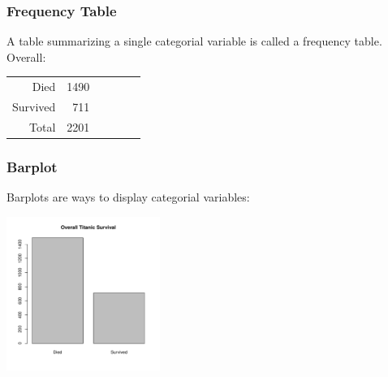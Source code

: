 \documentclass[handout]{beamer}
\newcommand{\blue}[1]{\textcolor{blue2}{#1}}
\begin{document}
\begin{frame}[fragile]
\frametitle{Frequency Table}
A table summarizing a single categorial variable is called a \blue{frequency table}.  Overall:

\begin{center}
\begin{tabular}{r|rrrr|r}
Died & 1490 \\
  Survived & 711 \\  
   \hline
  Total & 2201 \\
\end{tabular}
\end{center}

\end{frame}


\begin{frame}[fragile]
\frametitle{Barplot}
\blue{Barplots} are ways to display categorial variables:

\begin{center}
\includegraphics[width=5cm]{figure/barplot.pdf}
\end{center}


\end{frame}
\end{document}
